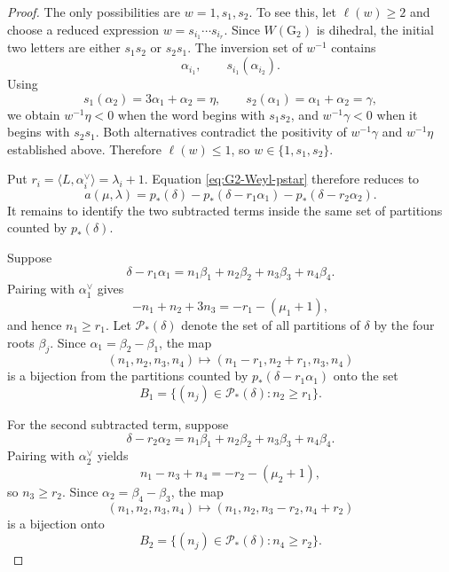 \documentclass[11pt]{article}
\theoremstyle{definition}
\theoremstyle{remark}
\newcommand{\typeG}{\ensuremath{\mathrm{G}}}
\begin{document}
\begin{proof}
The only possibilities are $w=1,s_1,s_2$.  To see this, let
$\ell(w)\ge2$ and choose a reduced expression
$w=s_{i_1}\cdots s_{i_r}$.  Since $W(\typeG_2)$ is dihedral, the initial two
letters are either $s_1s_2$ or $s_2s_1$.  The inversion set of $w^{-1}$
contains
\[
 \alpha_{i_1},\qquad s_{i_1}(\alpha_{i_2}).
\]
Using
\[
 s_1(\alpha_2)=3\alpha_1+\alpha_2=\eta,
 \qquad
 s_2(\alpha_1)=\alpha_1+\alpha_2=\gamma,
\]
we obtain $w^{-1}\eta<0$ when the word begins with $s_1s_2$, and
$w^{-1}\gamma<0$ when it begins with $s_2s_1$.  Both alternatives contradict
the positivity of $w^{-1}\gamma$ and $w^{-1}\eta$ established above.
Therefore $\ell(w)\le1$, so $w\in\{1,s_1,s_2\}$.

Put $r_i=\langle L,\alpha_i^\vee\rangle=\lambda_i+1$.  Equation
\eqref{eq:G2-Weyl-pstar} therefore reduces to
\begin{equation}\label{eq:G2-three-terms}
 a(\mu,\lambda)
   =p_*(\delta)-p_*(\delta-r_1\alpha_1)
                    -p_*(\delta-r_2\alpha_2).
\end{equation}
It remains to identify the two subtracted terms inside the same set of
partitions counted by $p_*(\delta)$.

Suppose
\[
 \delta-r_1\alpha_1
    =n_1\beta_1+n_2\beta_2+n_3\beta_3+n_4\beta_4.
\]
Pairing with $\alpha_1^\vee$ gives
\[
   -n_1+n_2+3n_3=-r_1-(\mu_1+1),
\]
and hence $n_1\ge r_1$.  Let $\mathcal P_*(\delta)$ denote the set of all partitions of $\delta$ by the
four roots $\beta_j$.  Since $\alpha_1=\beta_2-\beta_1$, the map
\begin{equation}\label{eq:G2-bijection-one}
 (n_1,n_2,n_3,n_4)
 \longmapsto(n_1-r_1,n_2+r_1,n_3,n_4)
\end{equation}
is a bijection from the partitions counted by
$p_*(\delta-r_1\alpha_1)$ onto the set
\begin{equation}\label{eq:G2-B1}
  B_1=\{(n_j)\in\mathcal P_*(\delta):n_2\ge r_1\}.
\end{equation}

For the second subtracted term, suppose
\[
 \delta-r_2\alpha_2
    =n_1\beta_1+n_2\beta_2+n_3\beta_3+n_4\beta_4.
\]
Pairing with $\alpha_2^\vee$ yields
\[
    n_1-n_3+n_4=-r_2-(\mu_2+1),
\]
so $n_3\ge r_2$.  Since $\alpha_2=\beta_4-\beta_3$, the map
\begin{equation}\label{eq:G2-bijection-two}
 (n_1,n_2,n_3,n_4)
 \longmapsto(n_1,n_2,n_3-r_2,n_4+r_2)
\end{equation}
is a bijection onto
\begin{equation}\label{eq:G2-B2}
  B_2=\{(n_j)\in\mathcal P_*(\delta):n_4\ge r_2\}.
\end{equation}


\end{proof}
\end{document}
